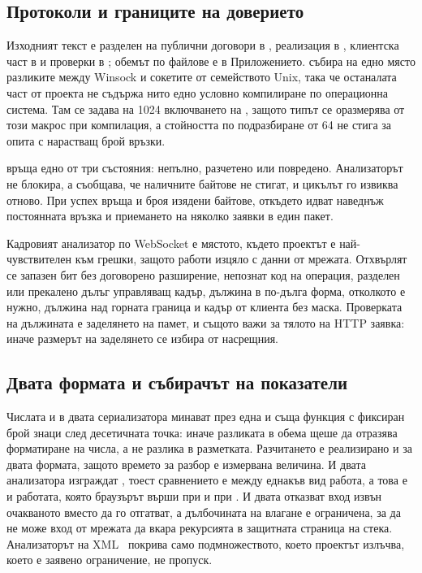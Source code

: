 \subsection{Протоколи и границите на доверието}
\label{sec:implementation}

Изходният текст е разделен на публични договори в , реализация в ,
клиентска част в  и проверки в ; обемът по файлове е в Приложението.
 събира на едно място разликите между Winsock и сокетите от семейството Unix,
така че останалата част от проекта не съдържа нито едно условно компилиране по операционна
система. Там  се задава на 1024  включването на
, защото типът  се оразмерява от този макрос при компилация, а
стойността по подразбиране от 64 не стига за опита с нарастващ брой връзки.

 връща едно от три състояния: непълно, разчетено или повредено.
Анализаторът не блокира, а съобщава, че наличните байтове не стигат, и цикълът го извиква
отново. При успех връща и броя изядени байтове, откъдето идват наведнъж постоянната връзка и
приемането на няколко заявки в един пакет.

Кадровият анализатор по WebSocket е мястото, където проектът е най-чувствителен към грешки,
защото работи изцяло с данни от мрежата. Отхвърлят се запазен бит без договорено разширение,
непознат код на операция, разделен или прекалено дълъг управляващ кадър, дължина в по-дълга
форма, отколкото е нужно, дължина над горната граница и кадър от клиента без маска. Проверката
на дължината е  заделянето на памет, и същото важи за тялото на HTTP заявка:
иначе размерът на заделянето се избира от насрещния.

\subsection{Двата формата и събирачът на показатели}

Числата и в двата сериализатора минават през една и съща функция с фиксиран брой знаци след
десетичната точка: иначе разликата в обема щеше да отразява форматиране на числа, а не разлика
в разметката. Разчитането е реализирано и за двата формата, защото времето за разбор е
измервана величина. И двата анализатора изграждат , тоест сравнението е между
еднакъв вид работа, а това е и работата, която браузърът върши при  и при
. И двата отказват вход извън очакваното вместо да го отгатват, а дълбочината
на влагане е ограничена, за да не може вход от мрежата да вкара рекурсията в защитната страница
на стека. Анализаторът на XML~\cite{xml10} покрива само подмножеството, което проектът излъчва,
което е заявено ограничение, не пропуск.

